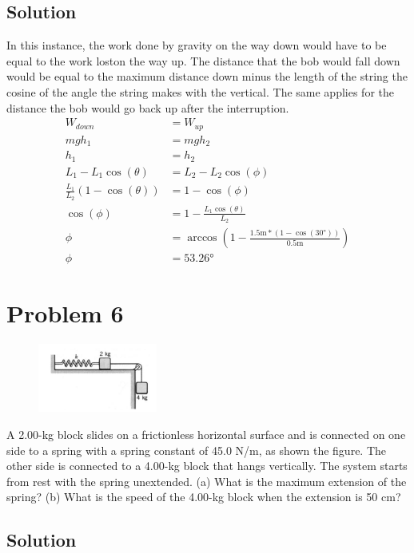 \documentclass[12pt]{article}
\begin{document}
\subsection*{Solution}
In this instance, the work done by gravity on the way down would have to be equal to the work loston the way up. The distance that the bob would fall down would be equal to the maximum distance down minus the length of the string the cosine of the angle the string makes with the vertical. The same applies for the distance the bob would go back up after the interruption.
\begin{align*}
    W_{down} &= W_{up}\\
    mgh_1 &= mgh_2\\
    h_1 &= h_2\\
    L_1 - L_1\cos(\theta) &= L_2 - L_2\cos(\phi)\\
    \frac{L_1}{L_2}(1-\cos(\theta)) &= 1 - \cos(\phi)\\
    \cos(\phi) &= 1 - \frac{L_1\cos(\theta)}{L_2}\\
    \phi &= \arccos\left(1 - \frac{1.5\unit{\meter}*(1 - \cos(30\unit{\degree}))}{0.5\unit{\meter}}\right)\\
    \phi    &=  \boxed{53.26\unit{\degree}}
\end{align*}

\pagebreak
\section*{Problem 6}
\begin{figure}
    \vspace{-30pt}
    \includegraphics[width=0.35\textwidth]{graph_6.png} 
\end{figure}
A 2.00-kg block slides on a frictionless horizontal surface and is connected on one side to a spring with a spring constant of 45.0 N/m, as shown the figure. The other side is connected to a 4.00-kg block that hangs vertically. The system starts from rest with the spring unextended. (a) What is the maximum extension of the spring? (b) What is the speed of the 4.00-kg block when the extension is 50 cm?

\subsection*{Solution}
\end{document}
